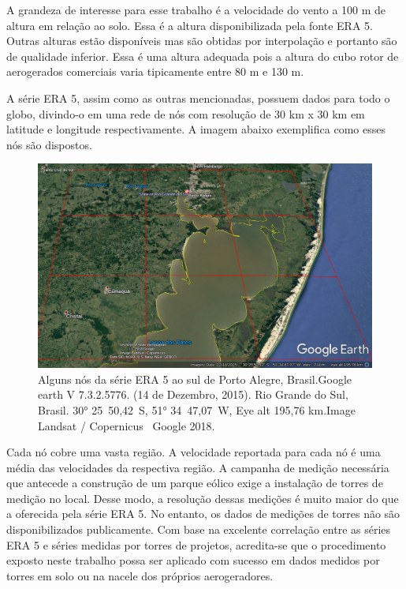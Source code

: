 \documentclass[
	12pt,				%
	openright,			%
	oneside,			%
	a4paper,			%
	english,			%
	french,				%
	spanish,			%
	brazil				%
	]{abntex2}
\begin{document}
A grandeza de interesse para esse trabalho é a velocidade do vento a 100 m de altura em relação ao solo. Essa é a altura disponibilizada pela fonte ERA 5. Outras alturas estão disponíveis mas são obtidas por interpolação e portanto são de qualidade inferior. Essa é uma altura adequada pois a altura do cubo rotor de aerogerados comerciais varia tipicamente entre 80 m e 130 m. 


A série ERA 5, assim como as outras mencionadas, possuem dados para todo o globo, divindo-o em uma rede de nós com resolução de 30 km x 30 km em latitude e longitude respectivamente. A imagem abaixo exemplifica como esses nós são dispostos. 


\begin{figure}[h]
    \centering
	\includegraphics[width=\textwidth]{rs_era5_nodes2}
	\caption{Alguns nós da série ERA 5 ao sul de Porto Alegre, Brasil.\newline Google earth V 7.3.2.5776. (14 de Dezembro, 2015). Rio Grande do Sul, Brasil.
\ang{30} 25\textquotesingle\ 50,42\textquotesingle\textquotesingle\ S, \ang{51} 34\textquotesingle\ 47,07\textquotesingle\textquotesingle\ W, Eye alt 195,76 km.\newline Image Landsat / Copernicus \textcopyright\ Google 2018.}
\end{figure}
\FloatBarrier

Cada nó cobre uma vasta região. A velocidade reportada para cada nó é uma média das velocidades da respectiva região. A campanha de medição necessária que antecede a construção de um parque eólico exige a instalação de torres de medição no local. Desse modo, a resolução dessas medições é muito maior do que a oferecida pela série ERA 5. No entanto, os dados de medições de torres não são disponibilizados publicamente. Com base na excelente correlação entre as séries ERA 5 e séries medidas por torres de projetos, acredita-se que o procedimento exposto neste trabalho possa ser aplicado com sucesso em dados medidos por torres em solo ou na nacele dos próprios aerogeradores.
\end{document}
